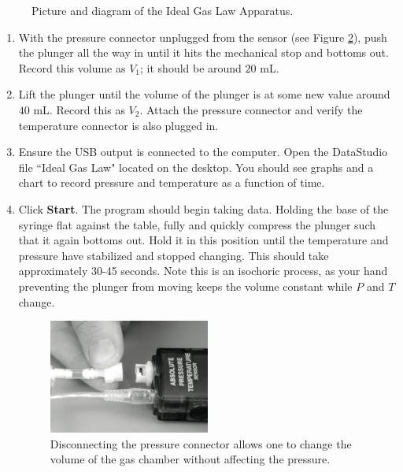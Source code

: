 \begin{figure}
\begin{subfigure}{0.48\textwidth}
\end{subfigure}
\caption{Picture and diagram of the Ideal Gas Law Apparatus.}
\label{idealapp}
\end{figure}

\begin{enumerate}
	\item With the pressure connector unplugged from the sensor (see Figure \ref{pdisc}), push the plunger all the way in until it hits the mechanical stop and bottoms out.  Record this volume as $V_{1}$; it should be around $20$ mL.
	\item Lift the plunger until the volume of the plunger is at some new value around $40$ mL.  Record this as $V_{2}$.  Attach the pressure connector and verify the temperature connector is also plugged in.
	\item Ensure the USB output is connected to the computer.  Open the DataStudio file ``Ideal Gas Law" located on the desktop.  You should see graphs and a chart to record pressure and temperature as a function of time.
	\item Click \textbf{Start}.  The program should begin taking data.  Holding the base of the syringe flat against the table, fully and quickly compress the plunger such that it again bottoms out.  Hold it in this position until the temperature and pressure have stabilized and stopped changing.  This should take approximately 30-45 seconds.  Note this is an isochoric process, as your hand preventing the plunger from moving keeps the volume constant while $P$ and $T$ change.
	\begin{figure}
		\centering
		\includegraphics[width=0.5\textwidth]{./Exp1-11/pic/pressuregaugepic}
		\caption{Disconnecting the pressure connector allows one to change the volume of the gas chamber without affecting the pressure.}
		\label{pdisc}
	\end{figure}


\end{enumerate}
